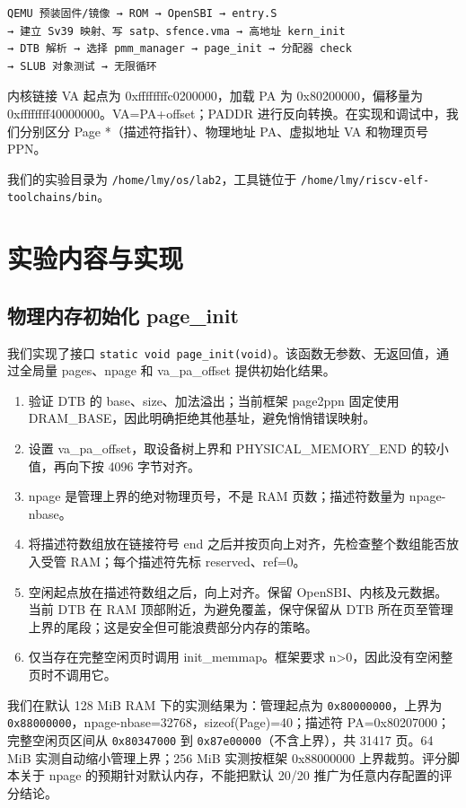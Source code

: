 \documentclass[UTF8,a4paper,10pt]{ctexart}
\begin{document}
\begin{lstlisting}
QEMU 预装固件/镜像 → ROM → OpenSBI → entry.S
→ 建立 Sv39 映射、写 satp、sfence.vma → 高地址 kern_init
→ DTB 解析 → 选择 pmm_manager → page_init → 分配器 check
→ SLUB 对象测试 → 无限循环
\end{lstlisting}

内核链接 VA 起点为 0xffffffffc0200000，加载 PA 为 0x80200000，偏移量为 0xffffffff40000000。VA=PA+offset；PADDR 进行反向转换。在实现和调试中，我们分别区分 Page *（描述符指针）、物理地址 PA、虚拟地址 VA 和物理页号 PPN。


我们的实验目录为 \nolinkurl{/home/lmy/os/lab2}，工具链位于 \nolinkurl{/home/lmy/riscv-elf-toolchains/bin}。


\section{实验内容与实现}

\subsection{物理内存初始化 page\_init}

我们实现了接口 \nolinkurl{static void page_init(void)}。该函数无参数、无返回值，通过全局量 pages、npage 和 va\_pa\_offset 提供初始化结果。


\begin{enumerate}
\item 验证 DTB 的 base、size、加法溢出；当前框架 page2ppn 固定使用 DRAM\_BASE，因此明确拒绝其他基址，避免悄悄错误映射。

\item 设置 va\_pa\_offset，取设备树上界和 PHYSICAL\_MEMORY\_END 的较小值，再向下按 4096 字节对齐。

\item npage 是管理上界的绝对物理页号，不是 RAM 页数；描述符数量为 npage-nbase。

\item 将描述符数组放在链接符号 end 之后并按页向上对齐，先检查整个数组能否放入受管 RAM；每个描述符先标 reserved、ref=0。

\item 空闲起点放在描述符数组之后，向上对齐。保留 OpenSBI、内核及元数据。当前 DTB 在 RAM 顶部附近，为避免覆盖，保守保留从 DTB 所在页至管理上界的尾段；这是安全但可能浪费部分内存的策略。

\item 仅当存在完整空闲页时调用 init\_memmap。框架要求 n>0，因此没有空闲整页时不调用它。

\end{enumerate}
我们在默认 128 MiB RAM 下的实测结果为：管理起点为 \nolinkurl{0x80000000}，上界为 \nolinkurl{0x88000000}，npage-nbase=32768，sizeof(Page)=40；描述符 PA=0x80207000；完整空闲页区间从 \nolinkurl{0x80347000} 到 \nolinkurl{0x87e00000}（不含上界），共 31417 页。64 MiB 实测自动缩小管理上界；256 MiB 实测按框架 0x88000000 上界裁剪。评分脚本关于 npage 的预期针对默认内存，不能把默认 20/20 推广为任意内存配置的评分结论。
\end{document}

